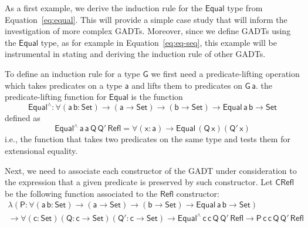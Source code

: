 \documentclass[acmsmall,screen,review,anonymous]{acmart}
\theoremstyle{definition}
\begin{document}

As a first example, we derive the induction rule for the $\mathsf{Equal}$ type from Equation~\ref{eq:equal}.
This will provide a simple case study that will inform the investigation of more complex GADTs.
Moreover, since we define GADTs using the $\mathsf{Equal}$ type,
as for example in Equation~\ref{eq:eq-seq},
this example will be instrumental in stating and deriving the induction rule of other GADTs.

To define an induction rule for a type $\mathsf{G}$ we first need a predicate-lifting operation
which takes predicates on a type $\mathsf{a}$ and lifts them to predicates on $\mathsf{G\,a}$.
the predicate-lifting function for $\mathsf{Equal}$ is the function
\[
\mathsf{Equal^{\wedge} : \forall (a\,b : Set) \to (a \to Set) \to (b \to Set) \to Equal\,a\,b \to Set}
\]
defined as
\[
\mathsf{Equal^{\wedge}\,a\,a\,Q\,Q'\,Refl = \forall (x : a) \to Equal\,(Q\,x)(Q'\,x)}
\]
i.e., the function that takes two predicates on the same type and tests them for extensional equality.

Next, we need to associate each constructor of the GADT under consideration
to the expression that a given predicate is preserved by such constructor.
Let $\mathsf{CRefl}$ be the following function associated to the $\mathsf{Refl}$ constructor:
\begin{multline*}
\mathsf{\lambda (P : \forall (a\,b : Set) \to (a \to Set) \to (b \to Set) \to Equal\,a\,b \to Set)} \\
\mathsf{\to \forall (c : Set) (Q : c \to Set) (Q' : c \to Set) \to Equal^{\wedge}\,c\,c\,Q\,Q'\,Refl \to P\,c\,c\,Q\,Q'\,Refl}
\end{multline*}
\end{document}
